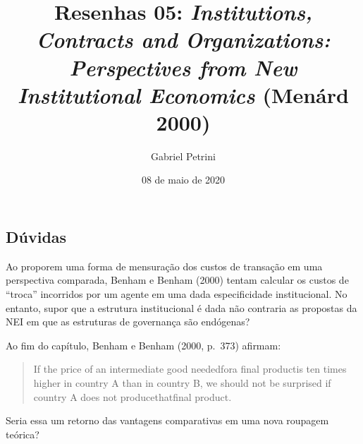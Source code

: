\documentclass[9pt,twocolumn,twoside,lineno]{style}
\title{Resenhas 05: \textit{Institutions, Contracts and Organizations: Perspectives from New Institutional Economics} (Menárd 2000)}
\date{08 de maio de  2020}
\author[$\ddagger$]{Gabriel Petrini}
\affil[$\ddagger$]{Doutorando no instituto de Economia da Unicamp}
\begin{document}
\maketitle\articletypemark
\marginmark
\thispagestyle{firststyle}




\begin{sigstatement}
	\sffamily
	{%
		\begin{mdframed}[style=stylesigstyle]%
			\section*{Dúvidas}%
	Ao proporem uma forma de mensuração dos custos de transação em uma perspectiva comparada, Benham e Benham (2000) tentam calcular os custos de ``troca'' incorridos por um agente em uma dada especificidade institucional. No entanto, supor que a estrutura institucional é dada não contraria as propostas da NEI em que as estruturas de governança são endógenas?
	
	Ao fim do capítulo, Benham e Benham (2000, p.~373) afirmam:
	
	\begin{quotation}
		If the price of an intermediate good neededfora final
		productis ten times higher in country A than in country B, we should not be
		surprised if country A does not producethatfinal product.
	\end{quotation}
	Seria essa um retorno das vantagens comparativas em uma nova roupagem teórica?
	
	\end{mdframed}}
\end{sigstatement}
	
\end{document}
